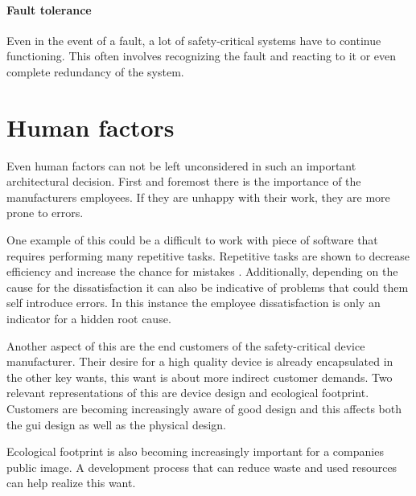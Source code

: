 \paragraph{Fault tolerance}
Even in the event of a fault, a lot of safety-critical systems have to continue functioning. This often involves recognizing the fault and reacting to it or even complete redundancy of the system.

\section{Human factors}
Even human factors can not be left unconsidered in such an important architectural decision. First and foremost there is the importance of the manufacturers employees. If they are unhappy with their work, they are more prone to errors.

One example of this could be a difficult to work with piece of software that requires performing many repetitive tasks. Repetitive tasks are shown to decrease efficiency and increase the chance for mistakes \cite{Wyatt.1937}. Additionally, depending on the cause for the dissatisfaction it can also be indicative of problems that could them self introduce errors. In this instance the employee dissatisfaction is only an indicator for a hidden root cause.

Another aspect of this are the end customers of the safety-critical device manufacturer. Their desire for a high quality device is already encapsulated in the other key wants, this want is about more indirect customer demands. Two relevant representations of this are device design and ecological footprint. Customers are becoming increasingly aware of good design \cite{HBR.September2015} and this affects both the \acrfull{gui} design as well as the physical design. 

Ecological footprint is also becoming increasingly important for a companies public image. A development process that can reduce waste and used resources can help realize this want.

